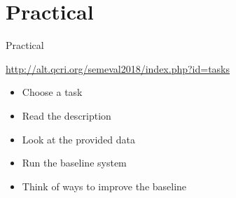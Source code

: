 \documentclass[10pt, compress]{beamer}
\begin{document}



\section{Practical}

\begin{frame}{Practical}

\begin{center}
\url{http://alt.qcri.org/semeval2018/index.php?id=tasks}
\end{center}

\begin{itemize}
  \item Choose a task
  \item Read the description
  \item Look at the provided data
  \item Run the baseline system
  \item Think of ways to improve the baseline
\end{itemize}

\end{frame}
\end{document}
